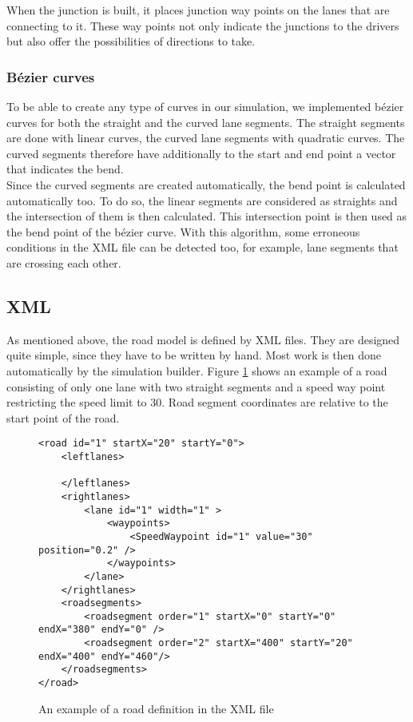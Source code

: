 \noindent When the junction is built, it places junction way points on the
lanes that are connecting to it. These way points not only indicate the
junctions to the drivers but also offer the possibilities of directions
to take.

\subsubsection{Bézier curves}
\label{sec:bezier}

To be able to create any type of curves in our simulation, we implemented
bézier curves for both the straight and the curved lane segments. The 
straight segments are done with linear curves, the curved lane segments
with quadratic curves. The curved segments therefore have additionally
to the start and end point a vector that indicates the bend. \\

\noindent Since the curved segments are created automatically, the bend
point is calculated automatically too. To do so, the linear segments are 
considered as straights and the intersection of them is then calculated.
This intersection point is then used as the bend point of the bézier curve.
With this algorithm, some erroneous conditions in the XML file can be
detected too, for example, lane segments that are crossing each other.

\subsection{XML}
\label{sec:XML}

As mentioned above, the road model is defined by XML files. They are 
designed quite simple, since they have to be written by hand. Most work
is then done automatically by the simulation builder. Figure 
\ref{fig:xmlRoad} shows an example of a road consisting of only one 
lane with two straight segments and a speed way point restricting the
speed limit to 30. Road segment coordinates are relative to the start
point of the road. \\

\resetListing
\lstset{language=XML}
\begin{figure}[H]
\begin{lstlisting}
<road id="1" startX="20" startY="0">
	<leftlanes>

	</leftlanes>
	<rightlanes>
		<lane id="1" width="1" >
			<waypoints>
				<SpeedWaypoint id="1" value="30" position="0.2" />
			</waypoints>
		</lane>
	</rightlanes>
	<roadsegments>
		<roadsegment order="1" startX="0" startY="0" endX="380" endY="0" />
		<roadsegment order="2" startX="400" startY="20" endX="400" endY="460"/>
	</roadsegments>
</road>
\end{lstlisting}
\caption{An example of a road definition in the XML file}
\label{fig:xmlRoad}
\end{figure}

